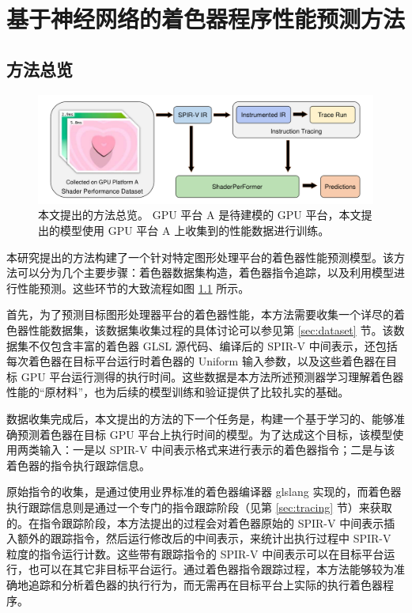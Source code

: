 \chapter{基于神经网络的着色器程序性能预测方法}

\section{方法总览}

\begin{figure}[h]
  \centering
  \includegraphics[width=1\linewidth]{figures/OverviewNewNewNew.pdf}
  \caption{本文提出的方法总览。 GPU 平台 A 是待建模的 GPU 平台，本文提出的模型使用 GPU 平台 A 上收集到的性能数据进行训练。}
  \label{fig:pipeline_overview}
\end{figure}


本研究提出的方法构建了一个针对特定图形处理平台的着色器性能预测模型。该方法可以分为几个主要步骤：着色器数据集构造，着色器指令追踪，以及利用模型进行性能预测。这些环节的大致流程如图 \ref{fig:pipeline_overview} 所示。

首先，为了预测目标图形处理器平台的着色器性能，本方法需要收集一个详尽的着色器性能数据集，该数据集收集过程的具体讨论可以参见第 \ref{sec:dataset} 节。该数据集不仅包含丰富的着色器 GLSL 源代码、编译后的 SPIR-V 中间表示，还包括每次着色器在目标平台运行时着色器的 Uniform 输入参数，以及这些着色器在目标 GPU 平台运行测得的执行时间。这些数据是本方法所述预测器学习理解着色器性能的“原材料”，也为后续的模型训练和验证提供了比较扎实的基础。

数据收集完成后，本文提出的方法的下一个任务是，构建一个基于学习的、能够准确预测着色器在目标 GPU 平台上执行时间的模型。为了达成这个目标，该模型使用两类输入：一是以 SPIR-V 中间表示格式来进行表示的着色器指令；二是与该着色器的指令执行跟踪信息。

原始指令的收集，是通过使用业界标准的着色器编译器 glslang \cite{glslang} 实现的，而着色器执行跟踪信息则是通过一个专门的指令跟踪阶段（见第 \ref{sec:tracing} 节）来获取的。在指令跟踪阶段，本方法提出的过程会对着色器原始的 SPIR-V 中间表示插入额外的跟踪指令，然后运行修改后的中间表示，来统计出执行过程中 SPIR-V 粒度的指令运行计数。这些带有跟踪指令的 SPIR-V 中间表示可以在目标平台运行，也可以在其它非目标平台运行。通过着色器指令跟踪过程，本方法能够较为准确地追踪和分析着色器的执行行为，而无需再在目标平台上实际的执行着色器程序。

